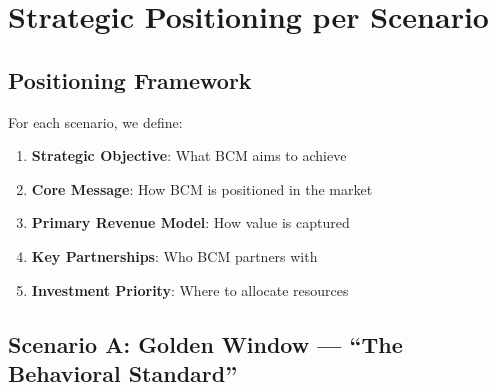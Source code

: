 
\section{Strategic Positioning per Scenario}
\label{sec:vvv2-positioning}

\subsection{Positioning Framework}

For each scenario, we define:
\begin{enumerate}
\item \textbf{Strategic Objective}: What BCM aims to achieve
\item \textbf{Core Message}: How BCM is positioned in the market
\item \textbf{Primary Revenue Model}: How value is captured
\item \textbf{Key Partnerships}: Who BCM partners with
\item \textbf{Investment Priority}: Where to allocate resources
\end{enumerate}


\subsection{Scenario A: Golden Window --- ``The Behavioral Standard''}

